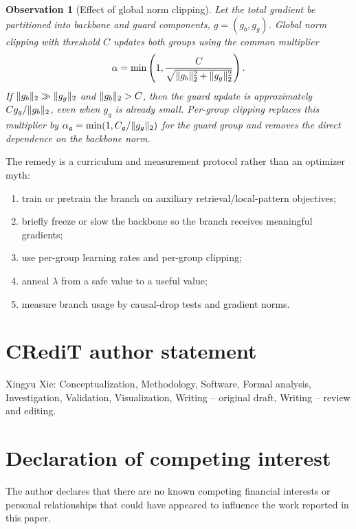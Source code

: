 \documentclass[preprint,12pt]{elsarticle}
\newtheorem{observation}[theorem]{Observation}
\DeclarePairedDelimiter{\norm}{\lVert}{\rVert}
\begin{document}
\begin{observation}[Effect of global norm clipping]
\label{prop:global-clipping}
Let the total gradient be partitioned into backbone and guard components, $g=(g_b,g_g)$. Global norm clipping with threshold $C$ updates both groups using the common multiplier
\begin{equation}
\alpha = \min\left(1,\frac{C}{\sqrt{\norm{g_b}_2^2+\norm{g_g}_2^2}}\right).
\end{equation}
If $\norm{g_b}_2\gg \norm{g_g}_2$ and $\norm{g_b}_2>C$, then the guard update is approximately $C g_g/\norm{g_b}_2$, even when $g_g$ is already small. Per-group clipping replaces this multiplier by $\alpha_g=\min(1,C_g/\norm{g_g}_2)$ for the guard group and removes the direct dependence on the backbone norm.
\end{observation}



The remedy is a curriculum and measurement protocol rather than an optimizer myth:
\begin{enumerate}
    \item train or pretrain the branch on auxiliary retrieval/local-pattern objectives;
    \item briefly freeze or slow the backbone so the branch receives meaningful gradients;
    \item use per-group learning rates and per-group clipping;
    \item anneal $\lambda$ from a safe value to a useful value;
    \item measure branch usage by causal-drop tests and gradient norms.
\end{enumerate}




\section*{CRediT author statement}
Xingyu Xie: Conceptualization, Methodology, Software, Formal analysis, Investigation, Validation, Visualization, Writing -- original draft, Writing -- review and editing.

\section*{Declaration of competing interest}
The author declares that there are no known competing financial interests or personal relationships that could have appeared to influence the work reported in this paper.
\end{document}
